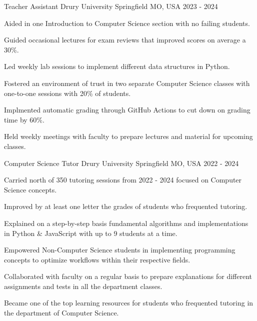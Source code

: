 
\begin{cventries}

    \cventry
    {Teacher Assistant} %
    {Drury University} %
    {Springfield MO, USA} %
    {2023 - 2024} %
    {
        \begin{cvitems} %
        \item{Aided in one Introduction to Computer Science section with no failing students.}
        \item{Guided occasional lectures for exam reviews that improved scores on average a 30\%.}
        \item{Led weekly lab sessions to implement different data structures in Python.}
        \item{Fostered an environment of trust in two separate Computer Science classes with one-to-one sessions with 20\% of students.}
        \item{Implmented automatic grading through GitHub Actions to cut down on grading time by 60\%.}
        \item{Held weekly meetings with faculty to prepare lectures and material for upcoming classes.}
        \end{cvitems}
    }


    \cventry
    {Computer Science Tutor} %
    {Drury University} %
    {Springfield MO, USA} %
    {2022 - 2024} %
    {
        \begin{cvitems}
        \item{Carried north of 350 tutoring sessions from 2022 - 2024 focused on Computer Science concepts.}
        \item{Improved by at least one letter the grades of students who frequented tutoring.}
        \item{Explained on a step-by-step basis fundamental algorithms and implementations in Python \& JavaScript with up to 9 students at a time.}
        \item{Empowered Non-Computer Science students in implementing programming concepts to optimize workflows within their respective fields.}
        \item{Collaborated with faculty on a regular basis to prepare explanations for different assignments and tests in all the department classes.}
        \item{Became one of the top learning resources for students who frequented tutoring in the department of Computer Science.}
        \end{cvitems}
    }


\end{cventries}
